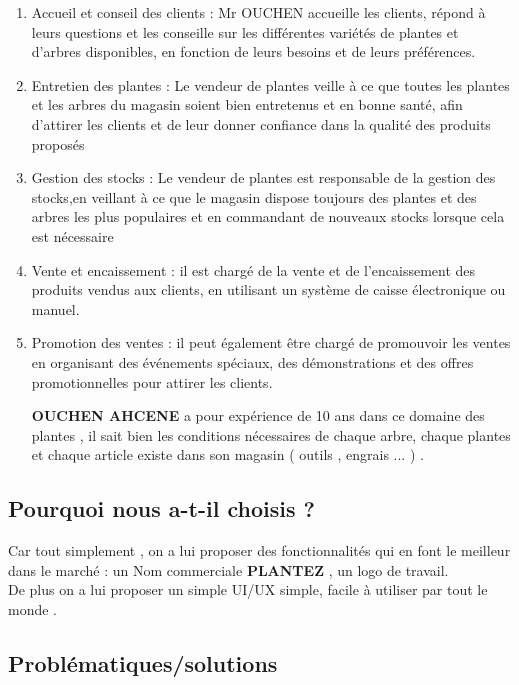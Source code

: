 \documentclass[a4paper,12pt,oneside]{article}
\begin{document}
{\begin{enumerate}
\item Accueil et conseil des clients : Mr OUCHEN
accueille les clients, répond à leurs questions
et les conseille sur les différentes variétés de
plantes et d'arbres disponibles, en fonction
de leurs besoins et de leurs préférences.
\item Entretien des plantes : Le vendeur de plantes
veille à ce que toutes les plantes et les arbres
du magasin soient bien entretenus et en
bonne santé, afin d'attirer les clients et de
leur donner confiance dans la qualité des
produits proposés
\item Gestion des stocks : Le vendeur de plantes est
responsable de la gestion des stocks,en veillant à ce que le magasin dispose toujours
des plantes et des arbres les plus populaires et
en commandant de nouveaux stocks lorsque cela
est nécessaire
\item Vente et encaissement : il est chargé de la
vente et de l'encaissement des produits vendus
aux clients, en utilisant un système de caisse
électronique ou manuel.
\item  Promotion des ventes : il peut également
être chargé de promouvoir les ventes en
organisant des événements spéciaux, des
démonstrations et des offres promotionnelles
pour attirer les clients.\\
        \vskip2mm

\textbf{OUCHEN AHCENE} a pour expérience de 10 ans
dans ce domaine des plantes , il sait bien les
conditions nécessaires de chaque arbre, chaque
plantes et chaque article existe dans son
magasin ( outils , engrais ... ) .

\end{enumerate}

\subsection{Pourquoi nous a-t-il choisis ?}
\hspace{1cm}Car tout simplement , on a lui proposer des
fonctionnalités qui en font le meilleur dans le
marché : un Nom commerciale \textbf{PLANTEZ} , un logo
de travail.\\
De plus on a lui proposer un simple UI/UX simple, facile à
utiliser par tout le monde .
}

\subsection{Problématiques/solutions}
\end{document}
